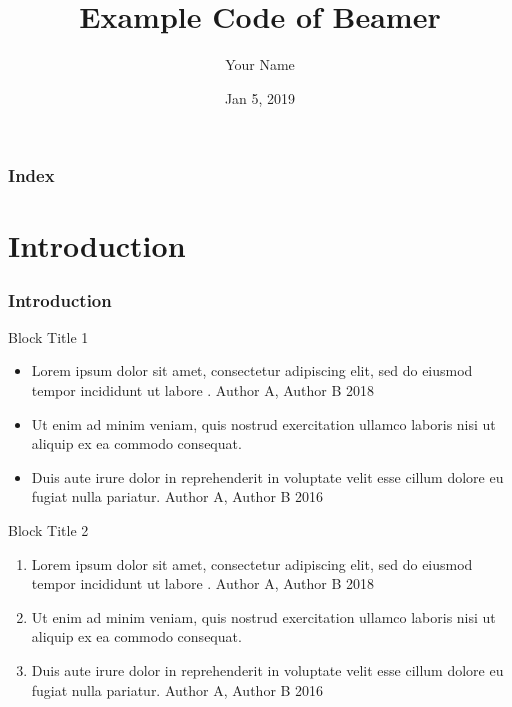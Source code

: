 \documentclass[9pt, dvipsnames]{beamer}
\title{Example Code of Beamer} %
\author[Your Name]{Your Name} %
\date{Jan 5, 2019} %
\begin{document}
\everymath{\displaystyle}

\begin{frame}
    \titlepage %
\end{frame}

\begin{frame}
    \frametitle{\textbf{Index}}
    \tableofcontents %
\end{frame}

\section{Introduction}\label{sec:introduction}
\begin{frame}
\frametitle{\textbf{Introduction}}
\begin{block}{Block Title 1}
\begin{itemize}
    \item Lorem ipsum dolor sit amet, consectetur adipiscing elit, sed do eiusmod tempor incididunt ut labore . {\scriptsize \color{red} Author A, Author B 2018 }
    \item Ut enim ad minim veniam, quis nostrud exercitation ullamco laboris nisi ut aliquip ex ea commodo consequat.
    \item Duis aute irure dolor in reprehenderit in voluptate velit esse cillum dolore eu fugiat nulla pariatur.  {\scriptsize \color{red} Author A, Author B 2016 }
\end{itemize}
\end{block}
    
\begin{exampleblock}{Block Title 2}
\begin{enumerate}
    \item Lorem ipsum dolor sit amet, consectetur adipiscing elit, sed do eiusmod tempor incididunt ut labore . {\scriptsize \color{red} Author A, Author B 2018 }
    \item Ut enim ad minim veniam, quis nostrud exercitation ullamco laboris nisi ut aliquip ex ea commodo consequat.
    \item Duis aute irure dolor in reprehenderit in voluptate velit esse cillum dolore eu fugiat nulla pariatur.  {\scriptsize \color{red} Author A, Author B 2016 }
\end{enumerate}
\end{exampleblock}
\end{frame}

\end{document}
